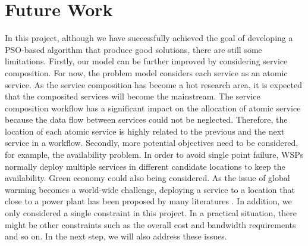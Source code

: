 \section{Future Work}
In this project, although we have successfully achieved the goal of developing a PSO-based algorithm that produce good solutions, 
there are still some limitations. Firstly, our model can be further improved by considering service composition. 
For now, the problem model considers each service as an atomic service. 
As the service composition has become a hot research area, it is expected that the composited services will become the mainstream.
The service composition workflow has a significant impact on the allocation of atomic service because the data flow between
services could not be neglected. Therefore, the location of each atomic service is highly related to the previous and the next service in a workflow.
Secondly, more potential objectives need to be considered, for example, the availability problem. In order to avoid single point failure, 
WSPs normally deploy multiple services in different candidate locations to keep the availability. Green economy could also being considered. As the issue
of global warming becomes a world-wide challenge, deploying a service to a location that close to a power plant has been proposed by many literatures \cite{Schien}.
In addition, we only considered a single constraint in this project. In a practical situation, there might be other constraints such as the overall cost and bandwidth requirements and so on. 
In the next step, we will also address these issues.


